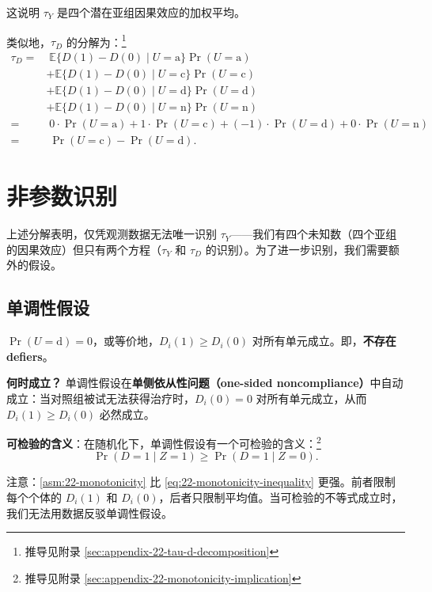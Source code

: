 这说明 $\tau_Y$ 是四个潜在亚组因果效应的加权平均。

类似地，$\tau_D$ 的分解为：\footnote{推导见附录 \cref{sec:appendix-22-tau-d-decomposition}}
\[
\begin{aligned}
\tau_D = & \; \mathbb{E}\{D(1) - D(0) \mid U = \text{a}\} \Pr(U = \text{a}) \\
& + \mathbb{E}\{D(1) - D(0) \mid U = \text{c}\} \Pr(U = \text{c}) \\
& + \mathbb{E}\{D(1) - D(0) \mid U = \text{d}\} \Pr(U = \text{d}) \\
& + \mathbb{E}\{D(1) - D(0) \mid U = \text{n}\} \Pr(U = \text{n}) \\
= & \; 0 \cdot \Pr(U = \text{a}) + 1 \cdot \Pr(U = \text{c}) + (-1) \cdot \Pr(U = \text{d}) + 0 \cdot \Pr(U = \text{n}) \\
= & \; \Pr(U = \text{c}) - \Pr(U = \text{d}).
\label{eq:22-tau-d-decomposition}
\end{aligned}
\]

\section{非参数识别}\label{sec:22-identification}

上述分解表明，仅凭观测数据无法唯一识别 $\tau_Y$——我们有四个未知数（四个亚组的因果效应）但只有两个方程（$\tau_Y$ 和 $\tau_D$ 的识别）。为了进一步识别，我们需要额外的假设。

\subsection{单调性假设}

\begin{Assumption}[单调性]\label{asm:22-monotonicity}
$\Pr(U = \text{d}) = 0$，或等价地，$D_i(1) \geq D_i(0)$ 对所有单元成立。即，\textbf{不存在 defiers}。
\end{Assumption}

\textbf{何时成立？} 单调性假设在\textbf{单侧依从性问题（one-sided noncompliance）}中自动成立：当对照组被试无法获得治疗时，$D_i(0) = 0$ 对所有单元成立，从而 $D_i(1) \geq D_i(0)$ 必然成立。

\textbf{可检验的含义}：在随机化下，单调性假设有一个可检验的含义：\footnote{推导见附录 \cref{sec:appendix-22-monotonicity-implication}}
\[
\Pr(D = 1 \mid Z = 1) \geq \Pr(D = 1 \mid Z = 0).
\label{eq:22-monotonicity-inequality}
\]

注意：\cref{asm:22-monotonicity} 比 \cref{eq:22-monotonicity-inequality} 更强。前者限制每个个体的 $D_i(1)$ 和 $D_i(0)$，后者只限制平均值。当可检验的不等式成立时，我们无法用数据反驳单调性假设。

